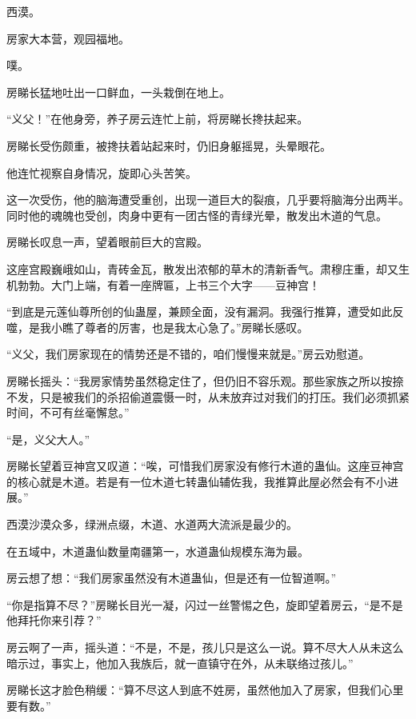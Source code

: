 
\begin{this_body}



西漠。

房家大本营，观园福地。

噗。

房睇长猛地吐出一口鲜血，一头栽倒在地上。

“义父！”在他身旁，养子房云连忙上前，将房睇长搀扶起来。

房睇长受伤颇重，被搀扶着站起来时，仍旧身躯摇晃，头晕眼花。

他连忙视察自身情况，旋即心头苦笑。

这一次受伤，他的脑海遭受重创，出现一道巨大的裂痕，几乎要将脑海分出两半。同时他的魂魄也受创，肉身中更有一团古怪的青绿光晕，散发出木道的气息。

房睇长叹息一声，望着眼前巨大的宫殿。

这座宫殿巍峨如山，青砖金瓦，散发出浓郁的草木的清新香气。肃穆庄重，却又生机勃勃。大门上端，有着一座牌匾，上书三个大字——豆神宫！

“到底是元莲仙尊所创的仙蛊屋，兼顾全面，没有漏洞。我强行推算，遭受如此反噬，是我小瞧了尊者的厉害，也是我太心急了。”房睇长感叹。

“义父，我们房家现在的情势还是不错的，咱们慢慢来就是。”房云劝慰道。

房睇长摇头：“我房家情势虽然稳定住了，但仍旧不容乐观。那些家族之所以按捺不发，只是被我们的杀招偷道震慑一时，从未放弃过对我们的打压。我们必须抓紧时间，不可有丝毫懈怠。”

“是，义父大人。”

房睇长望着豆神宫又叹道：“唉，可惜我们房家没有修行木道的蛊仙。这座豆神宫的核心就是木道。若是有一位木道七转蛊仙辅佐我，我推算此屋必然会有不小进展。”

西漠沙漠众多，绿洲点缀，木道、水道两大流派是最少的。

在五域中，木道蛊仙数量南疆第一，水道蛊仙规模东海为最。

房云想了想：“我们房家虽然没有木道蛊仙，但是还有一位智道啊。”

“你是指算不尽？”房睇长目光一凝，闪过一丝警惕之色，旋即望着房云，“是不是他拜托你来引荐？”

房云啊了一声，摇头道：“不是，不是，孩儿只是这么一说。算不尽大人从未这么暗示过，事实上，他加入我族后，就一直镇守在外，从未联络过孩儿。”

房睇长这才脸色稍缓：“算不尽这人到底不姓房，虽然他加入了房家，但我们心里要有数。”


\end{this_body}
